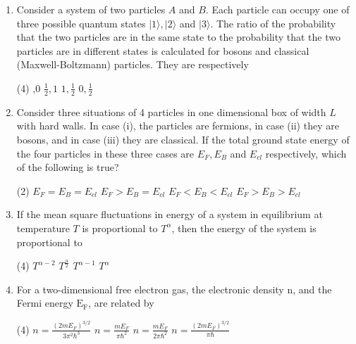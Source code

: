 \begin{enumerate}
	\item Consider a system of two particles $A$ and $B$. Each particle can occupy one of three possible quantum states $|1\rangle,|2\rangle$ and $|3\rangle$. The ratio of the probability that the two particles
	are in the same state to the probability that the two particles are in different states is calculated for bosons and classical (Maxwell-Boltzmann) particles. They are respectively
	{}
	
	\begin{tasks}(4)
		,0
		\task[\textbf{B.}]  $\frac{1}{2}, 1$
		\task[\textbf{C.}] $1, \frac{1}{2}$
		\task[\textbf{D.}] $0, \frac{1}{2}$
	\end{tasks}
	
	\item Consider three situations of 4 particles in one dimensional box of width $L$ with hard walls. In case (i), the particles are fermions, in case (ii) they are bosons, and in case (iii) they are classical. If the total ground state energy of the four particles in these three cases are $E_{F}, E_{B}$ and $E_{c l}$ respectively, which of the following is true?
	{}
		\begin{tasks}(2)
		\task[\textbf{A.}] $E_{F}=E_{B}=E_{c l}$
		\task[\textbf{B.}] $E_{F}>E_{B}=E_{c l}$
		\task[\textbf{C.}] $E_{F}<E_{B}<E_{c l}$
		\task[\textbf{D.}] $E_{F}>E_{B}>E_{c l}$
	\end{tasks}

	\item If the mean square fluctuations in energy of a system in equilibrium at temperature $T$ is proportional to $T^{\alpha}$, then the energy of the system is proportional to
	{\exyear{JEST 2017}}
	\begin{tasks}(4)
		\task[\textbf{A.}] $T^{\alpha-2}$
		\task[\textbf{B.}] $T^{\frac{\alpha}{2}}$
		\task[\textbf{C.}] $T^{\alpha-1}$
		\task[\textbf{D.}] $T^{\alpha}$
	\end{tasks}
	\item For a two-dimensional free electron gas, the electronic density $\mathrm{n}$, and the Fermi energy $\mathrm{E}_{\mathrm{F}}$, are related by
	{\exyear{GATE 2010}}
	\begin{tasks}(4)
		\task[\textbf{A.}] $n=\frac{\left(2 m E_{F}\right)^{3 / 2}}{3 \pi^{2} \hbar^{3}}$
		\task[\textbf{B.}] $n=\frac{m E_{F}}{\pi \hbar^{2}}$
		\task[\textbf{C.}] $n=\frac{m E_{F}}{2 \pi \hbar^{2}}$
		\task[\textbf{D.}] $n=\frac{\left(2 m E_{F}\right)^{3 / 2}}{\pi \hbar}$
	\end{tasks}
	

\end{enumerate}
